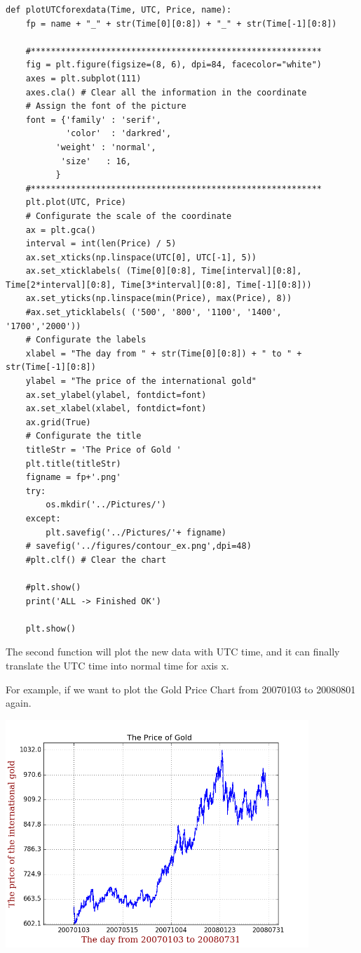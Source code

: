 \documentclass[12pt]{article}
\begin{document}
\begin{lstlisting}
def plotUTCforexdata(Time, UTC, Price, name):
    fp = name + "_" + str(Time[0][0:8]) + "_" + str(Time[-1][0:8])

    #**********************************************************
    fig = plt.figure(figsize=(8, 6), dpi=84, facecolor="white")
    axes = plt.subplot(111)
    axes.cla() # Clear all the information in the coordinate
    # Assign the font of the picture
    font = {'family' : 'serif',
            'color'  : 'darkred',
          'weight' : 'normal',
           'size'   : 16,
          }
    #**********************************************************
    plt.plot(UTC, Price)
    # Configurate the scale of the coordinate
    ax = plt.gca()
    interval = int(len(Price) / 5)
    ax.set_xticks(np.linspace(UTC[0], UTC[-1], 5))
    ax.set_xticklabels( (Time[0][0:8], Time[interval][0:8], Time[2*interval][0:8], Time[3*interval][0:8], Time[-1][0:8]))
    ax.set_yticks(np.linspace(min(Price), max(Price), 8))
    #ax.set_yticklabels( ('500', '800', '1100', '1400', '1700','2000'))
    # Configurate the labels
    xlabel = "The day from " + str(Time[0][0:8]) + " to " + str(Time[-1][0:8])
    ylabel = "The price of the international gold"
    ax.set_ylabel(ylabel, fontdict=font)
    ax.set_xlabel(xlabel, fontdict=font)
    ax.grid(True)
    # Configurate the title
    titleStr = 'The Price of Gold '
    plt.title(titleStr)
    figname = fp+'.png'
    try:
        os.mkdir('../Pictures/')
    except:
        plt.savefig('../Pictures/'+ figname)
    # savefig('../figures/contour_ex.png',dpi=48)
    #plt.clf() # Clear the chart

    #plt.show()
    print('ALL -> Finished OK')

    plt.show()
\end{lstlisting}

The second function will plot the new data with UTC time, and it can finally translate the UTC time into normal time for axis x.

For example, if we want to plot the Gold Price Chart from 20070103 to 20080801 again.

\includegraphics[width = 4.5in]{4.png}
\end{document}
